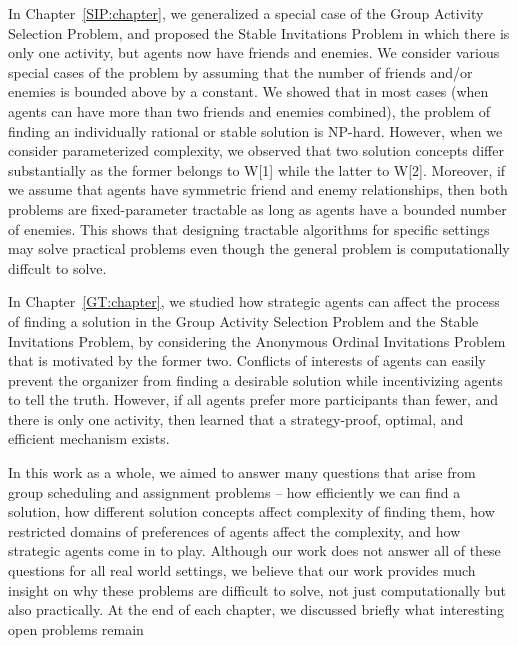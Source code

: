 In Chapter~\ref{SIP:chapter}, we generalized a special case of the Group Activity Selection Problem, and proposed the Stable Invitations Problem in which there is only one activity, but agents now have friends and enemies. We consider various special cases of the problem by assuming that the number of friends and/or enemies is bounded above by a constant. We showed that in most cases (when agents can have more than two friends and enemies combined), the problem of finding an individually rational or stable solution is NP-hard. However, when we consider parameterized complexity, we observed that two solution concepts differ substantially as the former belongs to W[1] while the latter to W[2]. Moreover, if we assume that agents have symmetric friend and enemy relationships, then both problems are fixed-parameter tractable as long as agents have a bounded number of enemies. This shows that designing tractable algorithms for specific settings may solve practical problems even though the general problem is computationally diffcult to solve. 

In Chapter~\ref{GT:chapter}, we studied how strategic agents can affect the process of finding a solution in the Group Activity Selection Problem and the Stable Invitations Problem, by considering the Anonymous Ordinal Invitations Problem that is motivated by the former two. Conflicts of interests of agents can easily prevent the organizer from finding a desirable solution while incentivizing agents to tell the truth. However, if all agents prefer more participants than fewer, and there is only one activity, then learned that a strategy-proof, optimal, and efficient mechanism exists. 

In this work as a whole, we aimed to answer many questions that arise from group scheduling and assignment problems -- how efficiently we can find a solution, how different solution concepts affect complexity of finding them, how restricted domains of preferences of agents affect the complexity, and how strategic agents come in to play. Although our work does not answer all of these questions for all real world settings, we believe that our work provides much insight on why these problems are difficult to solve, not just computationally but also practically. At the end of each chapter, we discussed briefly what interesting open problems remain 